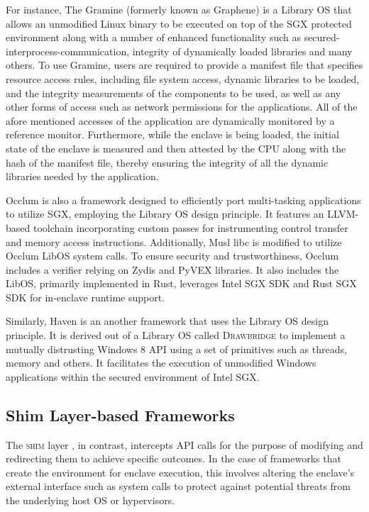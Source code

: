 \documentclass[article, doublespace,nopageskip]{VTthesis} %
\begin{document}
    For instance, The Gramine (formerly known as Graphene) \cite{Gramine} is a Library OS that allows an unmodified Linux binary to be executed on top of the SGX protected environment along with a number of enhanced functionality such as secured-interprocess-communication, integrity of dynamically loaded libraries and many others. To use Gramine, users are required to provide a manifest file that specifies resource access rules, including file system access, dynamic libraries to be loaded, and the integrity measurements of the components to be used, as well as any other forms of access such as network permissions for the applications. All of the afore mentioned accesses of the application are dynamically monitored by a reference monitor. Furthermore, while the enclave is being loaded, the initial state of the enclave is measured and then attested by the CPU along with the hash of the manifest file, thereby ensuring the integrity of all the dynamic libraries needed by the application. 

    Occlum \cite{Occulum} is also a framework designed to efficiently port multi-tasking applications to utilize SGX, employing the Library OS design principle. It features an LLVM-based toolchain incorporating custom passes for instrumenting control transfer and memory access instructions. Additionally, Musl libc is modified to utilize Occlum LibOS system calls. To ensure security and trustworthiness, Occlum includes a verifier relying on Zydis and PyVEX libraries. It also includes the LibOS, primarily implemented in Rust, leverages Intel SGX SDK and Rust SGX SDK for in-enclave runtime support.
    
    Similarly, Haven \cite{Haven} is an another framework that uses the Library OS design principle. It is derived out of a Library OS called \textsc{Drawbridge} \cite{Drawbridge} to implement a mutually distrusting Windows 8 API using a set of primitives such as threads, memory and others. It facilitates the execution of unmodified Windows applications within the secured environment of Intel SGX.  

    

    \subsection{Shim Layer-based Frameworks} \label{ase:Shim Layer based Frameworks}
    The \textsc{shim} layer \cite{shim}, in contrast, intercepts API calls for the purpose of modifying and redirecting them to achieve specific outcomes. In the case of frameworks that create the environment for enclave execution, this involves altering the enclave's external interface such as system calls to protect against potential threats from the underlying host OS or hypervisors.
\end{document}
